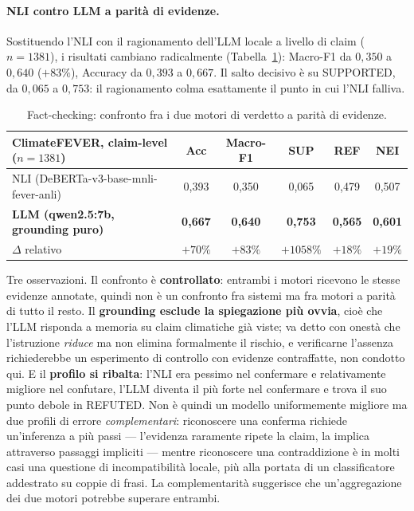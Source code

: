 \documentclass[11pt,a4paper]{report}
\begin{document}
\paragraph{NLI contro LLM a parità di evidenze.}\label{sec:ris-fc-confronto}
Sostituendo l'NLI con il ragionamento dell'LLM locale a livello di claim ($n = 1381$), i risultati
cambiano radicalmente (Tabella~\ref{tab:fc}): Macro-F1 da $0{,}350$ a $0{,}640$ ($+83\%$),
Accuracy da $0{,}393$ a $0{,}667$. Il salto decisivo è su SUPPORTED, da $0{,}065$ a $0{,}753$: il
ragionamento colma esattamente il punto in cui l'NLI falliva.

\begin{table}[t]
\centering
\small
\begin{tabular}{lccccc}
\toprule
\textbf{ClimateFEVER, claim-level} ($n{=}1381$) & \textbf{Acc} & \textbf{Macro-F1} & SUP & REF & NEI \\
\midrule
NLI (DeBERTa-v3-base-mnli-fever-anli) & 0,393 & 0,350 & 0,065 & 0,479 & 0,507 \\
\textbf{LLM (qwen2.5:7b, grounding puro)} & \textbf{0,667} & \textbf{0,640} & \textbf{0,753} & \textbf{0,565} & \textbf{0,601} \\
\midrule
$\Delta$ relativo & $+70\%$ & $+83\%$ & $+1058\%$ & $+18\%$ & $+19\%$ \\
\bottomrule
\end{tabular}
\caption{Fact-checking: confronto fra i due motori di verdetto a parità di evidenze.}
\label{tab:fc}
\end{table}

Tre osservazioni. Il confronto è \textbf{controllato}: entrambi i motori ricevono le stesse
evidenze annotate, quindi non è un confronto fra sistemi ma fra motori a parità di tutto il resto.
Il \textbf{grounding esclude la spiegazione più ovvia}, cioè che l'LLM risponda a memoria su claim
climatiche già viste; va detto con onestà che l'istruzione \emph{riduce} ma non elimina
formalmente il rischio, e verificarne l'assenza richiederebbe un esperimento di controllo con
evidenze contraffatte, non condotto qui. E il \textbf{profilo si ribalta}: l'NLI era pessimo nel
confermare e relativamente migliore nel confutare, l'LLM diventa il più forte nel confermare e
trova il suo punto debole in REFUTED. Non è quindi un modello uniformemente migliore ma due profili
di errore \emph{complementari}: riconoscere una conferma richiede un'inferenza a più passi ---
l'evidenza raramente ripete la claim, la implica attraverso passaggi impliciti --- mentre
riconoscere una contraddizione è in molti casi una questione di incompatibilità locale, più alla
portata di un classificatore addestrato su coppie di frasi. La complementarità suggerisce che
un'aggregazione dei due motori potrebbe superare entrambi.
\end{document}
